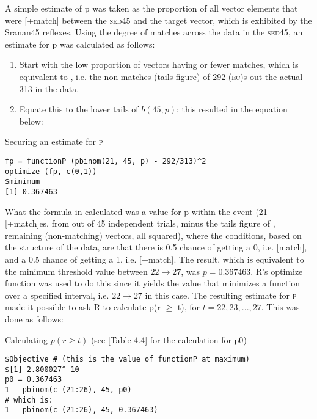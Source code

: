 A simple estimate of p was taken as the proportion of all vector elements that were [+match] between the \textsc{sed45} and the target vector, which is exhibited by the Sranan45 reflexes. Using the degree of matches across the data in the \textsc{sed45}, an estimate for p was calculated as follows:

\begin{enumerate}
\item {Start with the low proportion of vectors having  or fewer matches, which is equivalent to ,  i.e. the non-matches (tails figure) of 292 (\textsc{ec})s out the actual 313 in the data.}
\item{Equate this  to the lower tails  of $b(45, p)$; this resulted in the equation below:}
\end{enumerate}


\ea\label{Table 4.4}Securing an estimate for \textsc{p}\\
\begin{lstlisting}
fp = functionP (pbinom(21, 45, p) - 292/313)^2
optimize (fp, c(0,1))
$minimum
[1] 0.367463
\end{lstlisting}
\z

What the formula in  calculated was a value for p within the event (21 [+match]es, from out of 45 independent trials, minus the tails figure of , remaining (non-matching) vectors, all squared), where the conditions, based on the structure of the data, are that there is 0.5 chance of getting a 0, i.e. [\textminus{}match], and a 0.5 chance of getting a 1, i.e. [+match]. The result, which is equivalent to the minimum threshold value between $22\rightarrow27$, was $p = 0.367463$. R's optimize function was used to do this since it yields the value that minimizes a function over a specified interval, i.e. $22\rightarrow27$ in this case. The resulting estimate for \textsc{p} made it possible to ask R to calculate p(r $\geq$ t), for $t = 22, 23, ..., 27$. This was done as follows:

\ea Calculating $p(r \geq t)$ (see \ref{Table 4.4} for the calculation for {\ttfamily p0})\\\label{Table 4.5}
\begin{lstlisting}
$Objective # (this is the value of functionP at maximum)
$[1] 2.800027^-10 
p0 = 0.367463 
1 - pbinom(c (21:26), 45, p0) 
# which is: 
1 - pbinom(c (21:26), 45, 0.367463)
\end{lstlisting}
\z

